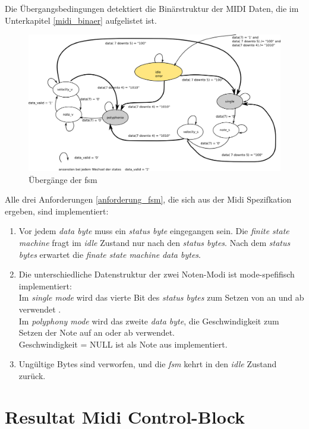 Die Übergangsbedingungen detektiert die Binärstruktur der MIDI Daten, die im Unterkapitel \ref{midi_binaer} aufgelistet ist.


\begin{figure}[H]
	\centering
	\includegraphics[width=1\textwidth]{images/midi_control/fsm_detailliert.png}
	\caption{Übergänge der fsm}
	\label{fig.midi_fsm_detail}
\end{figure}

Alle drei Anforderungen \ref{anforderung_fsm}, die sich aus der Midi Spezifkation ergeben, sind implementiert:
\begin{enumerate}
	\item Vor jedem \textit{data byte} muss ein \textit{status byte} eingegangen sein. Die \textit{finite state machine} fragt im \textit{idle} Zustand nur nach den \textit{status bytes}. Nach dem \textit{status bytes} erwartet die \textit{finate state machine} \textit{data bytes}. 
	\item Die unterschiedliche Datenstruktur der zwei Noten-Modi ist mode-spefifisch implementiert:\\
Im \textit{single mode} wird das vierte Bit des \textit{status bytes} zum Setzen von an und ab verwendet . \\
Im \textit{polyphony mode} wird das zweite \textit{data byte}, die Geschwindigkeit zum Setzen der Note auf an oder ab verwendet. \\ Geschwindigkeit = NULL ist als Note aus implementiert.\\
	\item Ungültige Bytes sind verworfen, und die \textit{fsm }kehrt in den   \textit{idle} Zustand zurück.
\end{enumerate}


\newpage
\section{Resultat Midi Control-Block}\label{sect.midi_resultat}

